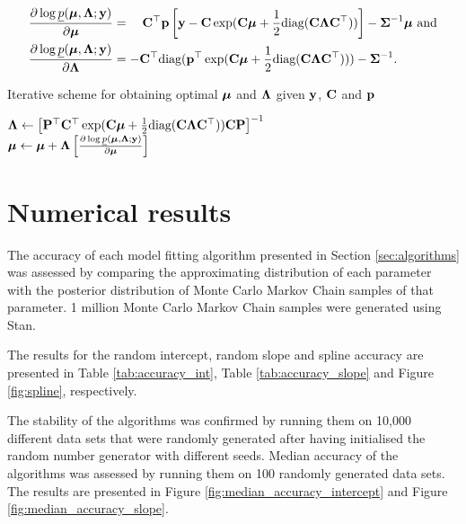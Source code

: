 \documentclass{article}[12pt]
\begin{document}
\begin{align*}
\frac{\partial \log \underline{p}({\boldsymbol \mu}, {\boldsymbol \Lambda}; {\bf y})}{\partial {\boldsymbol\mu}} &= \quad {\bf C}^\top{\bf p} \left [{\bf y} - {\bf C}\exp({\bf C} {\boldsymbol \mu} + {\frac{1}{2}} \text{diag}({\bf C} {\boldsymbol \Lambda} {\bf C}^\top)) \right ] - {\boldsymbol \Sigma}^{-1} {\boldsymbol \mu} \text{ and}\\
\frac{\partial \log \underline{p}({\boldsymbol \mu}, {\boldsymbol \Lambda}; {\bf y})}{\partial {\boldsymbol\Lambda}} &= -{\bf C}^\top \text{diag}({\bf p}^\top \exp({\bf C} {\boldsymbol \mu} +{\frac{1}{2}} \text{diag}({\bf C} {\boldsymbol \Lambda} {\bf C}^\top))) - {\boldsymbol \Sigma}^{-1}.
\end{align*}

\begin{algorithm}
\caption[Algorithm GVA NR]{Iterative scheme for obtaining optimal ${\boldsymbol \mu}$ and ${\boldsymbol \Lambda}$
given ${\bf y}$, ${\bf C}$ and ${\bf p}$}
\label{alg:algorithm_nr}
\begin{algorithmic}
\STATE ${\boldsymbol \Lambda} \leftarrow \left [ {\bf P}^\top {\bf C}^\top \exp({\bf C} {\boldsymbol \mu} + {\frac{1}{2}} \text{diag}({\bf C} {\boldsymbol \Lambda} {\bf C}^\top)) {\bf C} {\bf P} \right ]^{-1}$ \\ [1ex]
\STATE ${\boldsymbol \mu} \leftarrow {\boldsymbol\mu} + {\boldsymbol \Lambda} \left [ \frac{\partial \log \underline{p}({\boldsymbol \mu}, {\boldsymbol \Lambda}; {\bf y})}{\partial {\boldsymbol\mu}} \right ]$
\ENDWHILE
\end{algorithmic}
\end{algorithm}


\section{Numerical results}
\label{sec:results}

The accuracy of each model fitting algorithm presented in Section \ref{sec:algorithms} was assessed by comparing 
the approximating distribution of each parameter with the posterior distribution of Monte Carlo Markov Chain 
samples of that parameter. 1 million Monte Carlo Markov Chain samples were generated using Stan.

The results for the random intercept, random slope and spline accuracy are presented in
Table \ref{tab:accuracy_int}, Table \ref{tab:accuracy_slope} and Figure \ref{fig:spline},
respectively.

The stability of the algorithms was confirmed by running them on 10,000 
different data sets that were randomly generated after having initialised the random 
number generator with different seeds. Median accuracy of the algorithms was assessed
by running them on 100 randomly generated data sets. The results are presented in Figure
\ref{fig:median_accuracy_intercept} and Figure \ref{fig:median_accuracy_slope}.
\end{document}
